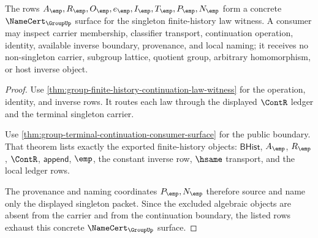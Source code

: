 \begin{theorem}
\label{thm:group-finite-history-namecert-surface}
The rows $A_{\emp},R_{\emp},O_{\emp},e_{\emp},I_{\emp},T_{\emp},P_{\emp},N_{\emp}$
form a concrete $\NameCert_{\GroupUp}$ surface for the singleton finite-history
law witness. A consumer may inspect carrier membership, classifier transport,
continuation operation, identity, available inverse boundary, provenance, and
local naming; it receives no non-singleton carrier, subgroup lattice, quotient
group, arbitrary homomorphism, or host inverse object.
\end{theorem}
\begin{proof}
Use \autoref{thm:group-finite-history-continuation-law-witness} for the
operation, identity, and inverse rows. It routes each law through the displayed
$\ContR$ ledger and the terminal singleton carrier.

Use \autoref{thm:group-terminal-continuation-consumer-surface} for the public
boundary. That theorem lists exactly the exported finite-history objects:
$\mathsf{BHist}$, $A_{\emp}$, $R_{\emp}$, $\ContR$, $\mathsf{append}$, $\emp$,
the constant inverse row, $\hsame$ transport, and the local ledger rows.

The provenance and naming coordinates $P_{\emp},N_{\emp}$ therefore source and
name only the displayed singleton packet. Since the excluded algebraic
objects are absent from the carrier and from the continuation boundary, the
listed rows exhaust this concrete $\NameCert_{\GroupUp}$ surface.
\end{proof}
